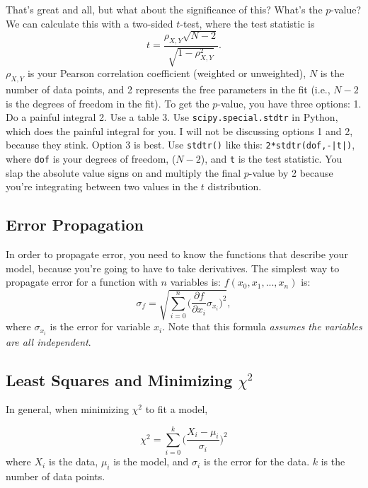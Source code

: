 That's great and all, but what about the significance of this? What's the $p$-value? We can calculate this with a two-sided $t$-test, where the test statistic is
\begin{equation}
    t = \frac{\rho_{X,Y}\sqrt{N-2}}{\sqrt{1-\rho_{X,Y}^{2}}}.
\end{equation}
$\rho_{X,Y}$ is your Pearson correlation coefficient (weighted or unweighted), $N$ is the number of data points, and 2 represents the free parameters in the fit (i.e., $N-2$ is the degrees of freedom in the fit). To get the $p$-value, you have three options: 1. Do a painful integral 2. Use a table 3. Use \texttt{scipy.special.stdtr} in Python, which does the painful integral for you. I will not be discussing options 1 and 2, because they stink. Option 3 is best. Use \texttt{stdtr()} like this: \texttt{2*stdtr(dof,-|t|)}, where \texttt{dof} is your degrees of freedom, ($N-2$), and \texttt{t} is the test statistic. You slap the absolute value signs on and multiply the final $p$-value by 2 because you're integrating between two values in the $t$ distribution.

\subsection{Error Propagation}
\label{sec:errorprop}
In order to propagate error, you need to know the functions that describe your model, because you're going to have to take derivatives. The simplest way to propagate error for a function with $n$ variables is: $f(x_{0},x_{1}, ...,  x_{n})$ is:
\begin{equation}
\label{eqn:errorprop}
    \sigma_{f} = \sqrt{\sum_{i=0}^{n}\Big( \frac{\partial f}{\partial x_{i}} \sigma_{x_{i}}\Big)^{2}},
\end{equation}
where $\sigma_{x_{i}}$ is the error for variable $x_{i}$. Note that this formula \textit{assumes the variables are all independent}. 

\subsection{Least Squares and Minimizing $\chi^{2}$}
\label{sec:chisq}
In general, when minimizing $\chi^{2}$ to fit a model, 

\begin{equation}
    \chi^{2} = \sum_{i=0}^{k} \Big( \frac{X_{i} - \mu_{i}}{\sigma_{i}} \Big)^{2}
\end{equation}
where $X_{i}$ is the data, $\mu_{i}$ is the model, and $\sigma_{i}$ is the error for the data. $k$ is the number of data points. \\

